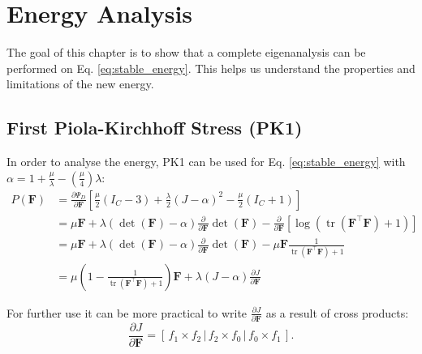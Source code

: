 \section{Energy Analysis}
The goal of this chapter is to show that a complete eigenanalysis can be performed on Eq. \ref{eq:stable_energy}. This helps us understand the properties and limitations of the new energy.


\subsection{First Piola-Kirchhoff Stress (PK1)}
In order to analyse the energy, PK1 can be used for Eq. \ref{eq:stable_energy} with $\alpha=1+\frac{\mu}{\lambda}-\left(\frac{\mu}{4}\right)\lambda$:
\begin{align*}
P(\mathbf{F}) &= \frac{\partial \Psi_{D}}{\partial \mathbf{F}} \left[ \frac{\mu}{2}\left(I_{C}-3\right) + \frac{\lambda}{2}(J-\alpha)^{2} - \frac{\mu}{2}\left(I_{C}+1\right) \right] \\
&= \mu \mathbf{F} + \lambda (\operatorname{det}(\mathbf{F})-\alpha)  \frac{\partial}{\partial \mathbf{F}} \operatorname{det}(\mathbf{F}) - \frac{\partial}{\partial \mathbf{F}} \left[\operatorname{log}\left(\operatorname{tr}(\mathbf{F}^\intercal \mathbf{F})+1\right)\right] \\
&= \mu \mathbf{F} + \lambda (\operatorname{det}(\mathbf{F})-\alpha)  \frac{\partial}{\partial \mathbf{F}} \operatorname{det}(\mathbf{F}) - \mu \mathbf{F} \frac{1}{\operatorname{tr}(\mathbf{F}^\intercal \mathbf{F}) + 1} \\
&= \mu \left( 1 - \frac{1}{\operatorname{tr}(\mathbf{F}^\intercal \mathbf{F}) + 1}\right) \mathbf{F} + \lambda(J-\alpha)\frac{\partial J}{\partial \mathbf{F}}
\end{align*}

For further use it can be more practical to write $\frac{\partial J}{\partial \mathbf{F}}$ as a result of cross products:
\begin{equation}\label{eq:cross_product}
\frac{\partial J}{\partial \mathbf{F}} = \left[ \,f_1 \times f_2\, \bigg| \,f_2 \times f_0\, \bigg| \,f_0 \times f_1\, \right].
\end{equation}


